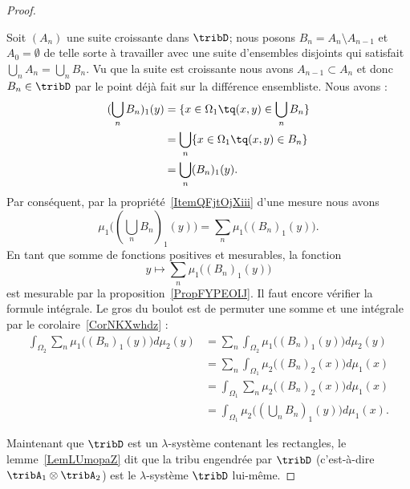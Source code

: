 \begin{proof}
\begin{subproof}

		Soit \( (A_n)\) une suite croissante dans \( \tribD\); nous posons \( B_n=A_n\setminus A_{n-1}\) et \( A_0=\emptyset\) de telle sorte à travailler avec une suite d'ensembles disjoints qui satisfait \( \bigcup_nA_n=\bigcup_nB_n\). Vu que la suite est croissante nous avons \( A_{n-1}\subset A_n\) et donc \( B_n\in\tribD\) par le point déjà fait sur la différence ensembliste. Nous avons :
		\begin{subequations}
			\begin{align}
				(\bigcup_nB_n)_1(y) & =\{ x\in \Omega_1\tq (x,y)\in\bigcup_nB_n \} \\
				                    & =\bigcup_n\{ x\in\Omega_1\tq (x,y)\in B_n \} \\
				                    & =\bigcup_n (B_n)_1(y).
			\end{align}
		\end{subequations}
		Par conséquent, par la propriété~\ref{ItemQFjtOjXiii} d'une mesure nous avons
		\begin{equation}
			\mu_1\big( (\bigcup_nB_n)_1(y) \big)=\sum_n\mu_1\big( (B_n)_1(y) \big).
		\end{equation}
		En tant que somme de fonctions positives et mesurables, la fonction
		\begin{equation}
			y\mapsto\sum_n\mu_1\big( (B_n)_1(y) \big)
		\end{equation}
		est mesurable par la proposition~\ref{PropFYPEOIJ}. Il faut encore vérifier la formule intégrale. Le gros du boulot est de permuter une somme et une intégrale par le corolaire~\ref{CorNKXwhdz} :
		\begin{subequations}
			\begin{align}
				\int_{\Omega_2}\sum_n\mu_1\big( (B_n)_1(y) \big)d\mu_2(y) & =\sum_n\int_{\Omega_2}\mu_1\big( (B_n)_1(y) \big)d\mu_2(y)     \\
				                                                          & =\sum_n\int_{\Omega_1}\mu_2\big( (B_n)_2(x) \big)d\mu_1(x)     \\
				                                                          & =\int_{\Omega_1}\sum_n\mu_2\big( (B_n)_2(x) \big)d\mu_1(x)     \\
				                                                          & =\int_{\Omega_1}\mu_2\big( (\bigcup_nB_n)_1(y) \big)d\mu_1(x).
			\end{align}
		\end{subequations}
	\end{subproof}
	Maintenant que \( \tribD\) est un \( \lambda\)-système contenant les rectangles, le lemme~\ref{LemLUmopaZ} dit que la tribu engendrée par \( \tribD\) (c'est-à-dire \( \tribA_1\otimes \tribA_2\)) est le \( \lambda\)-système \( \tribD\) lui-même.


\end{proof}
